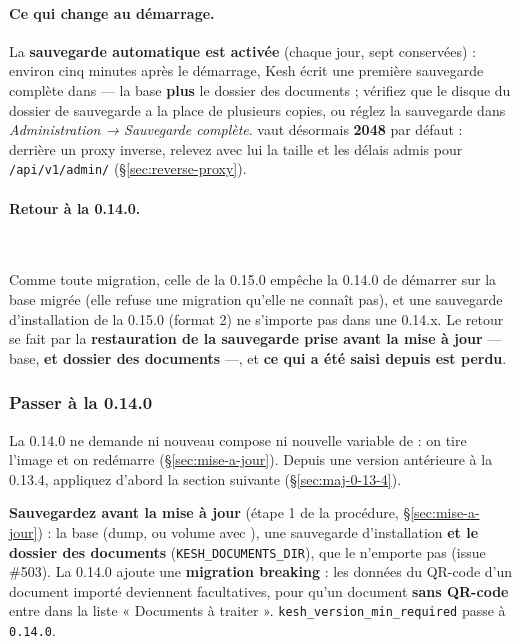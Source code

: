 \documentclass[a4paper,11pt,oneside]{article}
\begin{document}
\paragraph{Ce qui change au démarrage.} La \textbf{sauvegarde automatique est activée} (chaque jour, sept conservées) : environ cinq minutes après le démarrage, Kesh écrit une première sauvegarde complète dans  --- la base \textbf{plus} le dossier des documents ; vérifiez que le disque du dossier de sauvegarde a la place de plusieurs copies, ou réglez la sauvegarde dans \emph{Administration → Sauvegarde complète}.  vaut désormais \textbf{2048} par défaut : derrière un proxy inverse, relevez avec lui la taille et les délais admis pour \texttt{/api/v1/admin/} (\S\ref{sec:reverse-proxy}).

\paragraph{Retour à la 0.14.0.}\label{sec:maj-0-15-0-retour}\mbox{}\\
\begin{sloppypar}
Comme toute migration, celle de la 0.15.0 empêche la 0.14.0 de démarrer sur la base migrée (elle refuse une migration qu'elle ne connaît pas), et une sauvegarde d'installation de la 0.15.0 (format 2) ne s'importe pas dans une 0.14.x. Le retour se fait par la \textbf{restauration de la sauvegarde prise avant la mise à jour} --- base,  \textbf{et dossier des documents} ---, et \textbf{ce qui a été saisi depuis est perdu}.
\end{sloppypar}

\subsubsection{Passer à la 0.14.0}\label{sec:maj-0-14-0}

La 0.14.0 ne demande ni nouveau compose ni nouvelle variable de  : on tire l'image et on redémarre (\S\ref{sec:mise-a-jour}). Depuis une version antérieure à la 0.13.4, appliquez d'abord la section suivante (\S\ref{sec:maj-0-13-4}).

\begin{sloppypar}
\textbf{Sauvegardez avant la mise à jour} (étape 1 de la procédure, \S\ref{sec:mise-a-jour}) : la base (dump, ou volume avec ), une sauvegarde d'installation  \textbf{et le dossier des documents} (\texttt{KESH\_DOCUMENTS\_DIR}), que le  n'emporte pas (issue \#503). La 0.14.0 ajoute une \textbf{migration breaking} : les données du QR-code d'un document importé deviennent facultatives, pour qu'un document \textbf{sans QR-code} entre dans la liste « Documents à traiter ». \texttt{kesh\_version\_min\_required} passe à \texttt{0.14.0}.
\end{sloppypar}
\end{document}
